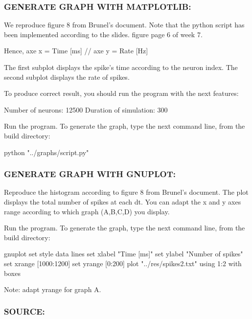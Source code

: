 \subsubsection*{G\-E\-N\-E\-R\-A\-T\-E G\-R\-A\-P\-H W\-I\-T\-H M\-A\-T\-P\-L\-O\-T\-L\-I\-B\-:}

We reproduce figure 8 from Brunel's document. Note that the python script has been implemented according to the slides. figure page 6 of week 7.

Hence, axe x = Time \mbox{[}ms\mbox{]} // axe y = Rate \mbox{[}Hz\mbox{]}

The first subplot displays the spike's time according to the neuron index. The second subplot displays the rate of spikes.

To produce correct result, you should run the program with the next features\-: \begin{DoxyVerb}    Number of neurons: 12500
    Duration of simulation: 300
\end{DoxyVerb}


Run the program. To generate the graph, type the next command line, from the build directory\-: \begin{DoxyVerb}    python "../graphs/script.py"
\end{DoxyVerb}


\subsubsection*{G\-E\-N\-E\-R\-A\-T\-E G\-R\-A\-P\-H W\-I\-T\-H G\-N\-U\-P\-L\-O\-T\-:}

Reproduce the histogram according to figure 8 from Brunel's document. The plot displays the total number of spikes at each dt. You can adapt the x and y axes range according to which graph (A,B,C,D) you display.

Run the program. To generate the graph, type the next command line, from the build directory\-: \begin{DoxyVerb}    gnuplot
    set style data lines
    set xlabel "Time [ms]"
    set ylabel "Number of spikes"
    set xrange [1000:1200]
    set yrange [0:200]
    plot "../res/spikes2.txt" using 1:2 with boxes
\end{DoxyVerb}


Note\-: adapt yrange for graph A.

\subsubsection*{S\-O\-U\-R\-C\-E\-:}

